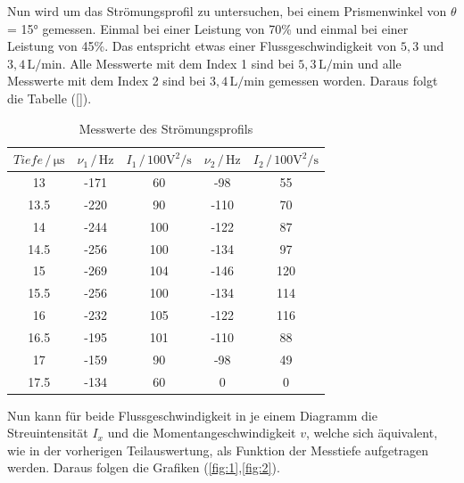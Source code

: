 Nun wird um das Strömungsprofil zu untersuchen, bei einem Prismenwinkel von $\theta$ = 15° gemessen. Einmal bei einer Leistung von 70\% und einmal bei einer Leistung von 45\%.
Das entspricht etwas einer Flussgeschwindigkeit von $5,3$ und $3,4 \, \si{\liter\per\minute}$. Alle Messwerte mit dem Index 1 sind bei $5,3 \, \si{\liter\per\minute}$ und 
alle Messwerte mit dem Index 2 sind bei $3,4 \, \si{\liter\per\minute}$ gemessen worden. Daraus folgt die Tabelle (\ref{}).

\begin{table}
    \centering
    \caption{Messwerte des Strömungsprofils}
    \begin{tabular}{c c c c c}
        \toprule

       {$Tiefe\, / \, \si{\micro\second}$} & {$\nu _1\, / \, \si{\hertz}$}& { $I_1 \, / \, 100\si{\volt\squared\per\second} $} & {$\nu_2 \, / \, \si{\hertz}$} & {$I_2 \, / \, 100\si{\volt\squared\per\second}$}\\
        \midrule
        13         &     -171    &        60   & -98   & 55  \\
        13.5       &     -220    &        90   & -110  & 70  \\
        14         &     -244    &        100  & -122  & 87  \\
        14.5       &     -256    &        100  & -134  & 97  \\
        15         &     -269    &        104  & -146  & 120  \\
        15.5       &     -256    &        100  & -134  & 114  \\
        16         &     -232    &        105  & -122  & 116  \\
        16.5       &     -195    &        101  & -110  & 88  \\
        17         &     -159    &        90   & -98    & 49  \\
        17.5       &     -134    &        60   & 0      & 0  \\
        \bottomrule
    \end{tabular}
    \label{tab:profil}
\end{table}

Nun kann für beide Flussgeschwindigkeit in je einem Diagramm die Streuintensität $I_x$ und die Momentangeschwindigkeit $v$, welche sich äquivalent, wie in der vorherigen 
Teilauswertung, als Funktion der Messtiefe aufgetragen werden. Daraus folgen die Grafiken (\ref{fig:1},\ref{fig:2}).

